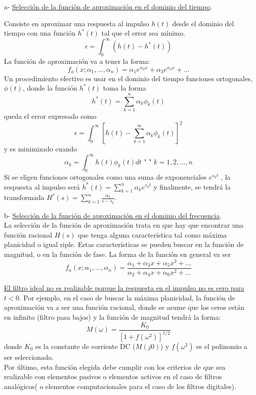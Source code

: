 \documentclass[informe.tex]{subfiles}
\begin{document}
a- \underline{Selección de la función de aproximación en el dominio del tiempo}.\newline 

Consiste en aproximar una respuesta al impulso $h(t)$ desde el dominio del tiempo con una función $h^*(t)$ tal que el error sea mínimo.	
	$$
	    \epsilon = \int_{0}^{\infty}
	               { \left( h(t) - h^*(t) \right) }
 	$$
La función de aproximación va a tener la forma:
	$$
	    f_a(x; \alpha_1, ... , \alpha_n ) = \alpha_1 e^{\alpha_2 x} + \alpha_3 e^{\alpha_4 x} + ...
 	$$
Un procedimiento efectivo es usar en el dominio del tiempo funciones ortogonales, $\phi(t)$, donde la función $h^*(t)$ toma la forma
	$$
		h^*(t)=\sum_{k=1}^{n}{\alpha_k \phi_k(t)}
	$$
queda el error expresado como	
	$$
		\epsilon = 
			\int_{0}^{\infty}{ 
				\left[
					h(t) 
					-
					\sum_{k=1}^{\infty}
						{\alpha_k \phi_k(t)}
				\right]^2
						}
	$$
y es minimizado cuando
	$$
		\alpha_k = \int_{0}^{\infty}{h(t) \phi_k(t) dt} \mbox{ "      "    }  k=1,2,...,n
	$$
Si se eligen funciones ortogonales como una suma de exponenciales $e^{s_k t}$ , la respuesta al impulso será $ h^*(t)=\sum_{k=1}^{n}{\alpha_k}{ e^{s_k t} }$ y finalmente, se tendrá la transformada $H^*(s)=\sum_{k=1}^{n}{\frac{\alpha_k}{s - s_k}}$. \newline

b- \underline{Selección de la función de aproximación en el dominio del frecuencia}.\\

La selección de la función de aproximación trata en que hay que encontrar una función racional $H(s)$ que tenga alguna característica tal como máxima planicidad o igual riple. Estas características se pueden buscar en la función de magnitud, o en la función de fase. La forma de la función en general va ser
	$$
		f_a(x; \alpha_1, ... , \alpha_n) = 
		   \frac{ \alpha_1 + \alpha_3 x + \alpha_5 x^2 + ... }
		                                        { \alpha_2 + \alpha_4 x + \alpha_6 x^2 + ... }
	$$

\underline{ El filtro ideal no es realizable porque la respuesta en el impulso no es cero para $t<0$}. Por ejemplo, en el caso de buscar la máxima planicidad, la función de aproximación va a ser una función racional, donde se asume que los ceros están en infinito (filtro pasa bajos) y la función de magnitud tendrá la forma:
	$$
		M(\omega) = \frac{ K_0 }
			{ \left[1 + f(\omega^2) \right]^{1/2}}
	$$
donde $K_0$ es la constante de corriente DC ($M(j0)$) y $f(\omega^2)$ es el polinomio a ser seleccionado.\\

Por último, esta función elegida debe cumplir con los criterios de que sea realizable con elementos pasivos o elementos activos en el caso de filtros analógicos( o elementos computacionales para el caso de los filtros digitales).\\ 
\end{document}
